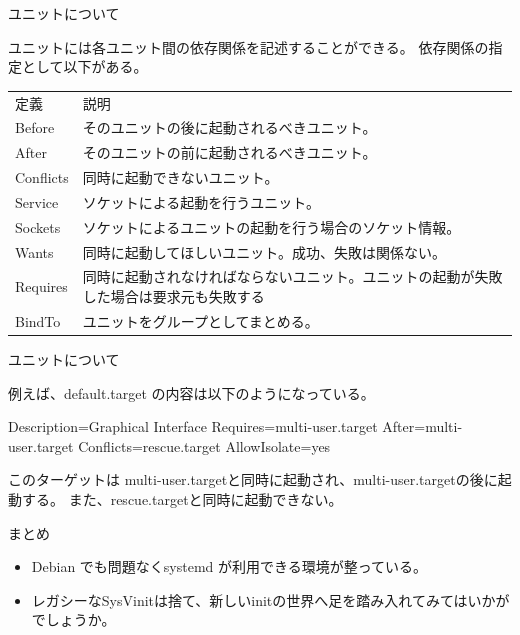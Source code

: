 \begin{frame}[containsverbatim]{ユニットについて}

ユニットには各ユニット間の依存関係を記述することができる。
依存関係の指定として以下がある。

\begin{center}
  \begin{tabular}{ll}
    定義 & 説明 \\
    Before & そのユニットの後に起動されるべきユニット。 \\
    After & そのユニットの前に起動されるべきユニット。 \\
    Conflicts & 同時に起動できないユニット。 \\
    Service & ソケットによる起動を行うユニット。 \\
    Sockets & ソケットによるユニットの起動を行う場合のソケット情報。 \\
    Wants  & 同時に起動してほしいユニット。成功、失敗は関係ない。\\
    Requires & 同時に起動されなければならないユニット。ユニットの起動が失敗した場合は要求元も失敗する \\
    BindTo & ユニットをグループとしてまとめる。
  \end{tabular}
\end{center}

\end{frame}

\begin{frame}[containsverbatim]{ユニットについて}

例えば、default.target の内容は以下のようになっている。

\begin{commandline}
[Unit]
Description=Graphical Interface
Requires=multi-user.target
After=multi-user.target
Conflicts=rescue.target
AllowIsolate=yes
\end{commandline}

このターゲットは
multi-user.targetと同時に起動され、multi-user.targetの後に起動する。
また、rescue.targetと同時に起動できない。

\end{frame}

\begin{frame}{まとめ}

\begin{itemize}
\item Debian でも問題なくsystemd が利用できる環境が整っている。
\item レガシーなSysVinitは捨て、新しいinitの世界へ足を踏み入れてみてはいかがでしょうか。
\end{itemize}

\end{frame}

